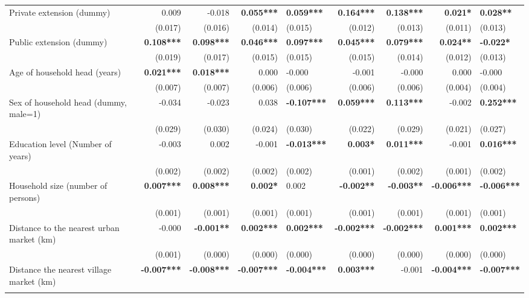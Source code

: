 \documentclass[
]{article}
\begin{document}
\begin{landscape}
\begin{longtable}[t]{lrrrlrrrl}
\endfoot
\bottomrule
\endlastfoot
Private extension (dummy) & 0.009 & -0.018 & \textbf{0.055***} & \textbf{0.059***} & \textbf{0.164***} & \textbf{0.138***} & \textbf{0.021*} & \textbf{0.028**}\\
 & (0.017) & (0.016) & (0.014) & (0.015) & (0.012) & (0.013) & (0.011) & (0.013)\\
Public extension (dummy) & \textbf{0.108***} & \textbf{0.098***} & \textbf{0.046***} & \textbf{0.097***} & \textbf{0.045***} & \textbf{0.079***} & \textbf{0.024**} & \textbf{-0.022*}\\
 & (0.019) & (0.017) & (0.015) & (0.015) & (0.015) & (0.014) & (0.012) & (0.013)\\
Age of household head (years) & \textbf{0.021***} & \textbf{0.018***} & 0.000 & -0.000 & -0.001 & -0.000 & 0.000 & -0.000\\
\addlinespace
 & (0.007) & (0.007) & (0.006) & (0.006) & (0.006) & (0.006) & (0.004) & (0.004)\\
Sex of household head (dummy, male=1) & -0.034 & -0.023 & 0.038 & \textbf{-0.107***} & \textbf{0.059***} & \textbf{0.113***} & -0.002 & \textbf{0.252***}\\
 & (0.029) & (0.030) & (0.024) & (0.030) & (0.022) & (0.029) & (0.021) & (0.027)\\
Education level (Number of years) & -0.003 & 0.002 & -0.001 & \textbf{-0.013***} & \textbf{0.003*} & \textbf{0.011***} & -0.001 & \textbf{0.016***}\\
 & (0.002) & (0.002) & (0.002) & (0.002) & (0.001) & (0.002) & (0.001) & (0.002)\\
\addlinespace
Household size (number of persons) & \textbf{0.007***} & \textbf{0.008***} & \textbf{0.002*} & 0.002 & \textbf{-0.002**} & \textbf{-0.003**} & \textbf{-0.006***} & \textbf{-0.006***}\\
 & (0.001) & (0.001) & (0.001) & (0.001) & (0.001) & (0.001) & (0.001) & (0.001)\\
Distance to the nearest urban market (km) & -0.000 & \textbf{-0.001**} & \textbf{0.002***} & \textbf{0.002***} & \textbf{-0.002***} & \textbf{-0.002***} & \textbf{0.001***} & \textbf{0.002***}\\
 & (0.001) & (0.000) & (0.000) & (0.000) & (0.000) & (0.000) & (0.000) & (0.000)\\
Distance the nearest village market (km) & \textbf{-0.007***} & \textbf{-0.008***} & \textbf{-0.007***} & \textbf{-0.004***} & \textbf{0.003***} & -0.001 & \textbf{-0.004***} & \textbf{-0.007***}\\
\addlinespace

\end{longtable}
\end{landscape}
\end{document}

